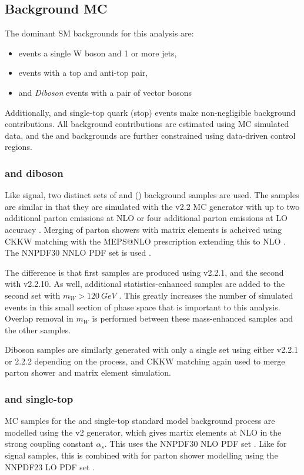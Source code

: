 \subsection{Background MC}
\label{subsection:mc_bkg}
The dominant SM backgrounds for this analysis are:
\begin{itemize}
    \item \wjets events a single W boson and 1 or more jets,
    \item \ttbar events with a top and anti-top pair,
    \item and \textit{Diboson} events with a pair of vector bosons
\end{itemize}
Additionally, \zjets and single-top quark (stop) events make non-negligible background contributions. All background contributions are estimated using MC simulated data, and the \wjets and \ttbar backgrounds are further constrained using data-driven control regions.

\subsubsection{\vjets and diboson}
Like signal, two distinct sets of \wjets and \zjets (\vjets) background samples are used. The samples are similar in that they are simulated with the \sherpa v2.2 MC generator \cite{Sherpa} with up to two additional parton emissions at NLO or four additional parton emissions at LO accuracy \cite{VJets}\cite{VJets_mW}. Merging of parton showers with matrix elements is acheived using CKKW matching with the MEPS@NLO prescription extending this to NLO \cite{MEPS}. The NNPDF30 NNLO PDF set is used \cite{PDF30}.

The difference is that first samples are produced using \sherpa v2.2.1, and the second with \sherpa v2.2.10. As well, additional statistics-enhanced \wjets samples are added to the second set with $m_W > 120~GeV$ \cite{VJets_mW}. This greatly increases the number of simulated events in this small section of phase space that is important to this analysis. Overlap removal in $m_W$ is performed between these mass-enhanced samples and the other \wjets samples.

Diboson samples are similarly generated with only a single set using either \sherpa v2.2.1 or 2.2.2 depending on the process, and CKKW matching again used to merge parton shower and matrix element simulation.

\subsubsection{\ttbar and single-top}
MC samples for the \ttbar and single-top standard model background process are modelled using the \powhegbox v2 \cite{Powheg} generator, which gives martix elements at NLO in the strong coupling constant $\alpha_s$. This uses the NNPDF30 NLO PDF set \cite{PDF30}. Like for signal samples, this is combined with  \cite{Pythia} for parton shower modelling using the NNPDF23 LO PDF set \cite{PDF23}.

